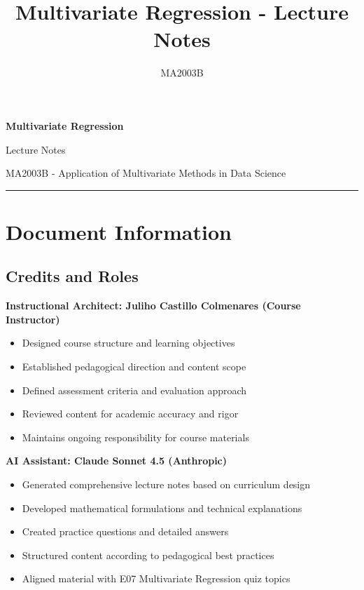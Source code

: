 \documentclass[
]{article}
\title{Multivariate Regression - Lecture Notes}
\author{MA2003B}
\date{}
\begin{document}
\maketitle

\textbf{Multivariate Regression}

Lecture Notes

MA2003B - Application of Multivariate Methods in Data Science

\begin{center}\rule{0.5\linewidth}{0.5pt}\end{center}

\textbf{ }

\section{Document Information}

\textbf{ }

\subsection{Credits and Roles}

\textbf{Instructional Architect: Juliho Castillo Colmenares (Course
Instructor)}

\begin{itemize}
\item
  Designed course structure and learning objectives
\item
  Established pedagogical direction and content scope
\item
  Defined assessment criteria and evaluation approach
\item
  Reviewed content for academic accuracy and rigor
\item
  Maintains ongoing responsibility for course materials
\end{itemize}

\textbf{AI Assistant: Claude Sonnet 4.5 (Anthropic)}

\begin{itemize}
\item
  Generated comprehensive lecture notes based on curriculum design
\item
  Developed mathematical formulations and technical explanations
\item
  Created practice questions and detailed answers
\item
  Structured content according to pedagogical best practices
\item
  Aligned material with E07 Multivariate Regression quiz topics
\end{itemize}
\end{document}
